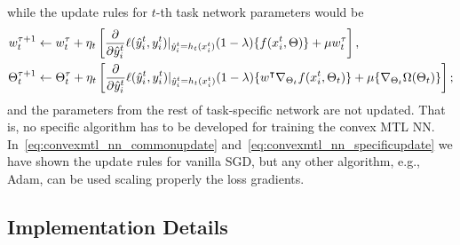 while the update rules for $t$-th task network parameters would be
\begin{equation}\label{eq:convexmtl_nn_specificupdate}
    \begin{aligned}
        w_t^{\tau + 1} &\gets w_t^\tau + \eta_t \left[  \frac{\partial}{\partial \hat{y}_i^t}  \lossf(\hat{y}_i^t, y_i^t) \vert_{\hat{y}_i^t = h_t(x_i^t)} (1 - \lambda) \lbrace f(x_i^t, \Theta) \rbrace + \mu w_t^\tau \right], \\
        \Theta_t^{\tau + 1} &\gets \Theta_t^\tau + \eta_t \left[ \frac{\partial}{\partial \hat{y}_i^t}  \lossf(\hat{y}_i^t, y_i^t) \vert_{\hat{y}_i^t = h_t(x_i^t)}  (1 - \lambda) \lbrace w^\intercal \nabla_{\Theta_t} f(x_i^t, \Theta_t)\rbrace + \mu \lbrace \nabla_{\Theta_t} \Omega( \Theta_t) \rbrace \right];
    \end{aligned}
\end{equation}
and the parameters from the rest of task-specific network are not updated.
%
That is, no specific algorithm has to be developed for training the convex MTL NN. In~\eqref{eq:convexmtl_nn_commonupdate} and~\eqref{eq:convexmtl_nn_specificupdate} we have shown the update rules for vanilla SGD, but any other algorithm, e.g., Adam, can be used scaling properly the loss gradients.





\subsection{Implementation Details}

